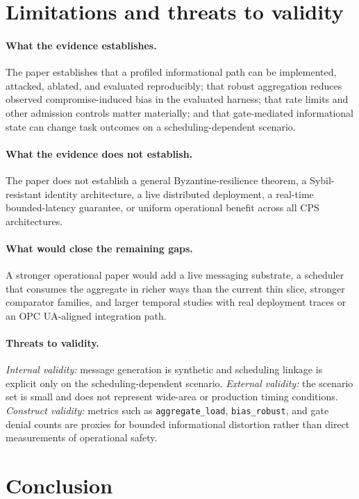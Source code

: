 \documentclass[11pt]{article}
\newcommand{\field}[1]{\texttt{#1}}
\begin{document}
\section{Limitations and threats to validity}

\paragraph{What the evidence establishes.}
The paper establishes that a profiled informational path can be implemented, attacked, ablated, and evaluated reproducibly; that robust aggregation reduces observed compromise-induced bias in the evaluated harness; that rate limits and other admission controls matter materially; and that gate-mediated informational state can change task outcomes on a scheduling-dependent scenario.

\paragraph{What the evidence does not establish.}
The paper does not establish a general Byzantine-resilience theorem, a Sybil-resistant identity architecture, a live distributed deployment, a real-time bounded-latency guarantee, or uniform operational benefit across all CPS architectures.

\paragraph{What would close the remaining gaps.}
A stronger operational paper would add a live messaging substrate, a scheduler that consumes the aggregate in richer ways than the current thin slice, stronger comparator families, and larger temporal studies with real deployment traces or an OPC UA-aligned integration path.

\paragraph{Threats to validity.}
\emph{Internal validity:} message generation is synthetic and scheduling linkage is explicit only on the scheduling-dependent scenario. \emph{External validity:} the scenario set is small and does not represent wide-area or production timing conditions. \emph{Construct validity:} metrics such as \field{aggregate\_load}, \field{bias\_robust}, and gate denial counts are proxies for bounded informational distortion rather than direct measurements of operational safety.

\section{Conclusion}
\end{document}
